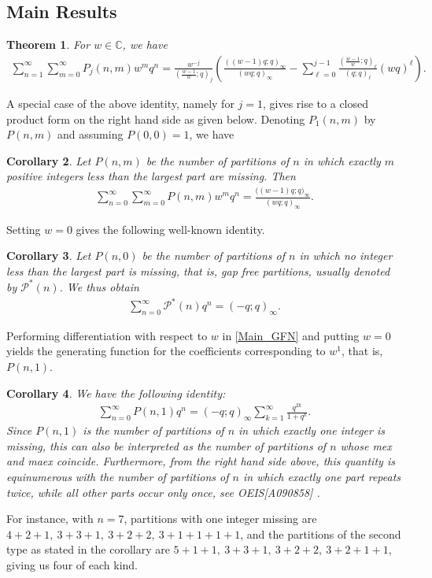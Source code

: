 \documentclass[12pt,reqno]{amsart}
\renewcommand{\(}{\left\(}
\renewcommand{\)}{\right\)}
\renewcommand{\[}{\left\[}
\renewcommand{\]}{\right\]}
\numberwithin{equation}{section}
\theoremstyle{plain}
\newtheorem{theorem}{Theorem}[section]
\newtheorem{corollary}[theorem]{Corollary}
\begin{document}
\subsection{Main Results}
\begin{theorem} \label{P_j(n,m)GFN}
For $w \in \mathbb{C}$, we have
 \begin{align}
\sum_{n=1}^{\infty}\sum_{m=0}^{\infty} P_j(n,m)w^mq^n=\frac{w^{-j}}{(\frac{w-1}{w};q)_j}\left(\frac{((w-1)q;q)_{\infty}}{(wq;q)_{\infty}}-\sum_{\ell=0}^{j-1}\frac{(\frac{w-1}{w};q)_{\ell}}{(q;q)_\ell}(wq)^\ell\right).\label{W_GFN_U}
\end{align}   
\end{theorem}
A special case of the above identity, namely for $j=1$, gives rise to a closed product form on the right hand side as given below. Denoting $P_1(n,m)$ by $P(n,m)$ and assuming $P(0,0)=1$, we have
\begin{corollary}\label{P_1(n,m)GFN}
Let $P(n,m)$ be the number of partitions of $n$ in which exactly $m$ positive integers less than the largest part are missing. Then
\begin{align}
\sum_{n=0}^{\infty}\sum_{m=0}^{\infty} P(n,m)w^mq^n=\frac{\big((w-1)q;q\big)_{\infty}}{(wq;q)_{\infty}}.\label{Main_GFN}
\end{align}
\end{corollary}
Setting $w=0$ gives the following well-known identity.
\begin{corollary} Let $P(n,0)$ be the number of partitions of $n$ in which no integer less than the largest part is missing, that is, gap free partitions, usually denoted by $\mathcal{P}^*(n)$. We thus obtain
\begin{align*}
\sum_{n=0}^{\infty} \mathcal{P}^*(n)q^n=(-q;q)_{\infty}.
\end{align*}
\end{corollary}
Performing differentiation with respect to $w$ in \eqref{Main_GFN} and putting $w=0$ yields the generating function for the coefficients corresponding to $w^1$, that is, $P(n,1)$.
\begin{corollary}\label{P_1(n,1)GFN}
We have the following identity:
\begin{align*}
\sum_{n=0}^{\infty}P(n,1)q^n=(-q;q)_{\infty}\sum_{k=1}^{\infty}\frac{q^{2k}}{1+q^k}.
\end{align*}
Since $P(n,1)$ is the number of partitions of $n$ in which exactly one integer is missing, this can also be interpreted as the number of partitions of $n$ whose \emph{mex} and \emph{maex} coincide. Furthermore, from the right hand side above, this quantity is equinumerous with the number of partitions of $n$ in which exactly one part repeats twice, while all other parts occur only once, see OEIS[A090858] \cite{OEIS}.
\end{corollary}
For instance, with $n=7$, partitions with one integer missing are $4+2+1, \ 3+3+1, \ 3+2+2, \ 3+1+1+1+1$, and the partitions of the second type as stated in the corollary are $5+1+1, \ 3+3+1, \ 3+2+2, \ 3+2+1+1$, giving us four of each kind.
\end{document}
